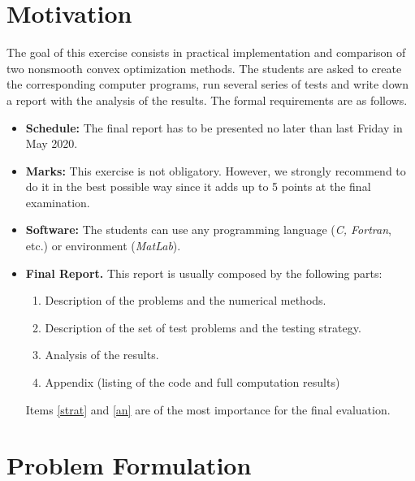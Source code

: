 


\date{April 2020}

\maketitle

\section{Motivation}

The goal of this exercise consists in practical
implementation and comparison of two nonsmooth convex
optimization methods. The students are asked to create the
corresponding computer programs, run several series of
tests and write down a report with the analysis of the
results. The formal requirements are as follows.
\begin{itemize}
\item
{\bf Schedule:} The final report has to be presented no
later than last Friday in May 2020.
\item
{\bf Marks:} This exercise is not obligatory.
However, we strongly recommend to do it
in the best possible way since
it adds up to 5 points at
the final examination.
\item
{\bf Software:} The students can use any
programming language ({\em C, Fortran}, etc.) or
environment ({\em MatLab}).
\item
{\bf Final Report.} This report is usually composed by the
following parts:
\begin{enumerate}
\item
Description of the problems and the numerical methods.
\item\label{strat}
Description of the set of test problems and
the testing strategy.
\item\label{an}
Analysis of the results.
\item
Appendix (listing of the code and full computation
results)
\end{enumerate}
Items \ref{strat} and \ref{an} are of the most importance
for the final evaluation.
\end{itemize}


\section{Problem Formulation}

